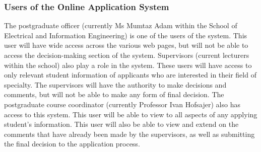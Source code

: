 \documentclass[journal]{IEEEtran}
\begin{document}
\hfill \break \subsubsection{Users of the Online Application System }
The postgraduate officer (currently Ms Mumtaz Adam within the School of Electrical and Information Engineering) is one of the users of the system. This user will have wide access across the various web pages, but will not be able to access the decision-making section of the system. Supervisors (current lecturers within the school) also play a role in the system. These users will have access to only relevant student information of applicants who are interested in their field of specialty. The supervisors will have the authority to make decisions and comments, but will not be able to make any form of final decision. The postgraduate course coordinator (currently Professor Ivan Hofsajer) also has access to this system. This user will be able to view to all aspects of any applying student's information. This user will also be able to view and extend on the comments that have already been made by the supervisors, as well as submitting the final decision to the application process.
\end{document}
